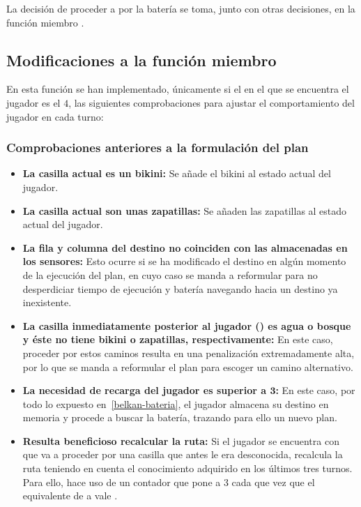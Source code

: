 La decisión de proceder a por la batería se toma, junto con otras decisiones, en la función miembro .

\subsection{Modificaciones a la función miembro }\label{belkan-think}

En esta función se han implementado, únicamente si el  en el que se encuentra el jugador es el $4$, las siguientes comprobaciones para ajustar el comportamiento del jugador en cada turno:

\subsubsection{Comprobaciones anteriores a la formulación del plan}

\begin{itemize}
	\item\textbf{La casilla actual es un bikini:} Se añade el bikini al estado actual del jugador.
	\item\textbf{La casilla actual son unas zapatillas:} Se añaden las zapatillas al estado actual del jugador.
	\item\textbf{La fila y columna del destino no coinciden con las almacenadas en los sensores:} Esto ocurre si se ha modificado el destino en algún momento de la ejecución del plan, en cuyo caso se manda a reformular para no desperdiciar tiempo de ejecución y batería navegando hacia un destino ya inexistente.
	\item\textbf{La casilla inmediatamente posterior al jugador () es agua o bosque y éste no tiene bikini o zapatillas, respectivamente:} En este caso, proceder por estos caminos resulta en una penalización extremadamente alta, por lo que se manda a reformular el plan para escoger un camino alternativo.
	\item\textbf{La necesidad de recarga del jugador es superior a $\boldsymbol{3}$:} En este caso, por todo lo expuesto en~\ref{belkan-bateria}, el jugador almacena su destino en memoria y procede a buscar la batería, trazando para ello un nuevo plan.
	\item\textbf{Resulta beneficioso recalcular la ruta:} Si el jugador se encuentra con que va a proceder por una casilla que antes le era desconocida, recalcula la ruta teniendo en cuenta el conocimiento adquirido en los últimos tres turnos. Para ello, hace uso de un contador  que pone a $3$ cada que vez que el equivalente de  a  vale .
\end{itemize}

